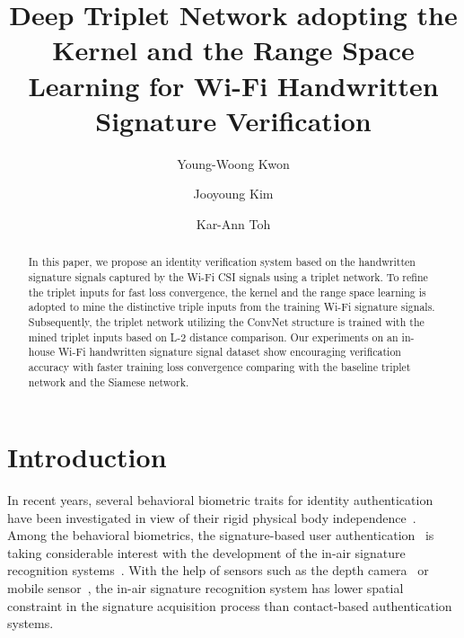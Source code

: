 \documentclass[runningheads]{llncs}
\begin{document}
%
\title{Deep Triplet Network adopting the Kernel and the Range Space Learning for Wi-Fi Handwritten Signature Verification}
%
%
\author{Young-Woong Kwon \and Jooyoung Kim \and Kar-Ann Toh}
%
%
%
\maketitle              %
%
\begin{abstract}
In this paper, we propose an identity verification system based on the handwritten signature signals captured by the Wi-Fi CSI signals using a triplet network. 
To refine the triplet inputs for fast loss convergence, the kernel and the range space learning is adopted to mine the distinctive triple inputs from the training Wi-Fi signature signals. 
Subsequently, the triplet network utilizing the ConvNet structure is trained with the mined triplet inputs based on L-2 distance comparison. 
Our experiments on an in-house Wi-Fi handwritten signature signal dataset show encouraging verification accuracy with faster training loss convergence comparing with the baseline triplet network and the Siamese network.

\end{abstract}
%
%
%
\section{Introduction}

In recent years, several behavioral biometric traits for identity authentication have been investigated in view of their rigid physical body independence~\cite{bailador2011analysis}. Among the behavioral biometrics, the signature-based user authentication~\cite{sanmorino2012survey,galbally2015line} is taking considerable interest with the development of the in-air signature recognition systems~\cite{jeon2012system,sesa2012information,malik20183dairsig}.
With the help of sensors such as the depth camera~\cite{malik20183dairsig} or mobile sensor~\cite{jeon2012system}, the in-air signature recognition system has lower spatial constraint in the signature acquisition process than contact-based authentication systems. 
\end{document}
